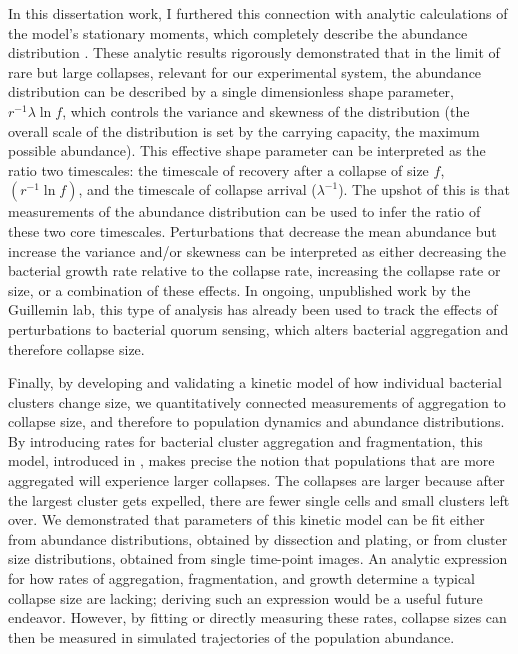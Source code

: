 In this dissertation work, I furthered this connection with analytic calculations of the model's stationary moments, which completely describe the abundance distribution \cite{schlomann2018stationary}. These analytic results rigorously demonstrated that in the limit of rare but large collapses, relevant for our experimental system, the abundance distribution can be described by a single dimensionless shape parameter, $r^{-1}\lambda\ln f$, which controls the variance and skewness of the distribution (the overall scale of the distribution is set by the carrying capacity, the maximum possible abundance).  This effective shape parameter can be interpreted as the ratio two timescales: the timescale of recovery after a collapse of size $f$, $(r^{-1}\ln f)$, and the timescale of collapse arrival ($\lambda^{-1}$). The upshot of this is that measurements of the abundance distribution can be used to infer the ratio of these two core timescales. Perturbations that decrease the mean abundance but increase the variance and/or skewness can be interpreted as either decreasing the bacterial growth rate relative to the collapse rate, increasing the collapse rate or size, or a combination of these effects. In ongoing, unpublished work by the Guillemin lab, this type of analysis has already been used to track the effects of perturbations to bacterial quorum sensing, which alters bacterial aggregation and therefore collapse size. 

Finally, by developing and validating a kinetic model of how individual bacterial clusters change size, we quantitatively connected measurements of aggregation to collapse size, and therefore to population dynamics and abundance distributions. By introducing rates for bacterial cluster aggregation and fragmentation, this model, introduced in \cite{schlomann_sublethal_2019}, makes precise the notion that populations that are more aggregated will experience larger collapses. The collapses are larger because after the largest cluster gets expelled, there are fewer single cells and small clusters left over. We demonstrated that parameters of this kinetic model can be fit either from abundance distributions, obtained by dissection and plating, or from cluster size distributions, obtained from single time-point images. An analytic expression for how rates of aggregation, fragmentation, and growth determine a typical collapse size are lacking; deriving such an expression would be a useful future endeavor. However, by fitting or directly measuring these rates, collapse sizes can then be measured in simulated trajectories of the population abundance. 

